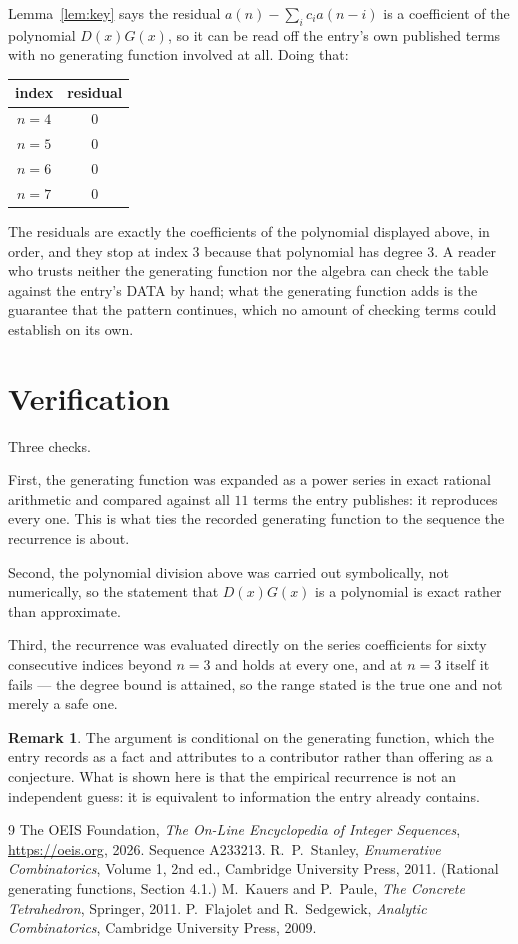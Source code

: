 \documentclass[11pt,a4paper]{article}
\theoremstyle{plain}
\theoremstyle{definition}
\newtheorem{remark}[theorem]{Remark}
\begin{document}
Lemma~\ref{lem:key} says the residual $a(n)-\sum_ic_ia(n-i)$ is a coefficient of the
polynomial $D(x)G(x)$, so it can be read off the entry's own published terms with no
generating function involved at all. Doing that:
\begin{center}
\begin{tabular}{cc}
index & residual \\ \hline
$n=4$ & $0$ \\
$n=5$ & $0$ \\
$n=6$ & $0$ \\
$n=7$ & $0$
\end{tabular}
\end{center}
The residuals are exactly the coefficients of the polynomial displayed above, in order, and
they stop at index $3$ because that polynomial has degree $3$. A reader who trusts
neither the generating function nor the algebra can check the table against the entry's DATA
by hand; what the generating function adds is the guarantee that the pattern continues, which
no amount of checking terms could establish on its own.

\section{Verification}

Three checks.

First, the generating function was expanded as a power series in exact rational arithmetic and
compared against all $11$ terms the entry publishes: it reproduces every one. This is
what ties the recorded generating function to the sequence the recurrence is about.

Second, the polynomial division above was carried out symbolically, not numerically, so the
statement that $D(x)G(x)$ is a polynomial is exact rather than approximate.

Third, the recurrence was evaluated directly on the series coefficients for sixty consecutive
indices beyond $n=3$ and holds at every one, and at $n=3$ itself it fails --- the
degree bound is attained, so the range stated is the true one and not merely a safe one.

\begin{remark}
The argument is conditional on the generating function, which the entry records as a fact and
attributes to a contributor rather than offering as a conjecture. What is shown here is that
the empirical recurrence is not an independent guess: it is equivalent to information the
entry already contains.
\end{remark}

\begin{thebibliography}{9}
 The OEIS Foundation, \emph{The On-Line Encyclopedia of Integer
Sequences}, \url{https://oeis.org}, 2026. Sequence A233213.
 R.~P.~Stanley, \emph{Enumerative Combinatorics}, Volume 1, 2nd ed.,
Cambridge University Press, 2011. (Rational generating functions, Section 4.1.)
 M.~Kauers and P.~Paule, \emph{The Concrete Tetrahedron}, Springer, 2011.
 P.~Flajolet and R.~Sedgewick, \emph{Analytic Combinatorics}, Cambridge
University Press, 2009.
\end{thebibliography}
\end{document}

